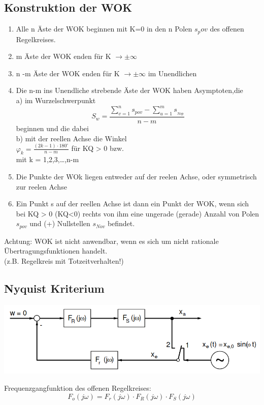 \documentclass[10pt,a4paper]{article}
\begin{document}
\subsection{Konstruktion der WOK}
\begin{mdframed}[style=exercise]
	\begin{enumerate}
		\item Alle n Äste der WOK beginnen mit K=0 in den n Polen $s_pov$ des offenen Regelkreises.
		\item m Äste der WOK enden für K $\rightarrow \pm \infty$
		\item n -m Äste der WOK enden für K $\rightarrow \pm \infty$ im Unendlichen
		\item Die n-m ins Unendliche strebende Äste der WOK haben Asymptoten,die\\
		      a) im Wurzelschwerpunkt
		      \[S_{w}=\frac{\sum_{v=1}^{n} s_{pov}-\sum_{u=1}^{m} s_{_{Nop}}}{n-m}\]
		      beginnen und die dabei\\
		      b) mit der reellen Achse die Winkel\\
		      $\varphi_{k}=\frac{(2 k-1) \cdot 180^{\circ}}{n-m}$ für KQ > 0 bzw.\\
		      mit k = 1,2,3,\dots,n-m
		\item Die Punkte der WOk liegen entweder auf der reelen Achse, oder symmetrisch zur reelen Achse
		\item Ein Punkt s auf der reellen Achse ist dann ein Punkt der WOK, wenn sich bei KQ > 0 (KQ<0)
		      rechts von ihm eine ungerade (gerade) Anzahl von Polen $s_{pov}$ und (+) Nullstellen $s_{Nov}$ befindet.
	\end{enumerate}

	Achtung: WOK ist nicht anwendbar, wenn es sich um nicht rationale
	Übertragungsfunktionen handelt.\\ (z.B. Regelkreis mit Totzeitverhalten!)
\end{mdframed}

\subsection{Nyquist Kriterium}
\begin{center}
	\includegraphics[width=.45\textwidth]{Figures/Nyquist.png}
\end{center}
Frequenzgangfunktion des offenen Regelkreises:
\[
	F_o (j\omega) = F_r (j\omega) \cdot F_R (j\omega) \cdot F_S (j\omega)
\]
\end{document}
